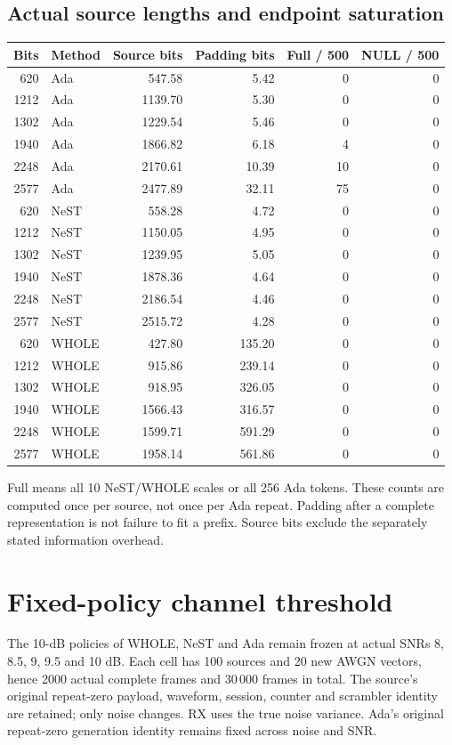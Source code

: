 \documentclass[10pt,letterpaper]{article}
\begin{document}
\subsection{Actual source lengths and endpoint saturation}
\begin{longtable}{@{}rlrrrr@{}}\toprule
Bits & Method & Source bits & Padding bits & Full / 500 & NULL / 500\\\midrule\endhead
620 & Ada & 547.58 & 5.42 & 0 & 0\\
1212 & Ada & 1139.70 & 5.30 & 0 & 0\\
1302 & Ada & 1229.54 & 5.46 & 0 & 0\\
1940 & Ada & 1866.82 & 6.18 & 4 & 0\\
2248 & Ada & 2170.61 & 10.39 & 10 & 0\\
2577 & Ada & 2477.89 & 32.11 & 75 & 0\\
620 & NeST & 558.28 & 4.72 & 0 & 0\\
1212 & NeST & 1150.05 & 4.95 & 0 & 0\\
1302 & NeST & 1239.95 & 5.05 & 0 & 0\\
1940 & NeST & 1878.36 & 4.64 & 0 & 0\\
2248 & NeST & 2186.54 & 4.46 & 0 & 0\\
2577 & NeST & 2515.72 & 4.28 & 0 & 0\\
620 & WHOLE & 427.80 & 135.20 & 0 & 0\\
1212 & WHOLE & 915.86 & 239.14 & 0 & 0\\
1302 & WHOLE & 918.95 & 326.05 & 0 & 0\\
1940 & WHOLE & 1566.43 & 316.57 & 0 & 0\\
2248 & WHOLE & 1599.71 & 591.29 & 0 & 0\\
2577 & WHOLE & 1958.14 & 561.86 & 0 & 0\\
\bottomrule\end{longtable}
Full means all 10 NeST/WHOLE scales or all 256 Ada tokens. These counts are computed once per source, not once per Ada repeat. Padding after a complete representation is not failure to fit a prefix. Source bits exclude the separately stated information overhead.


\section{Fixed-policy channel threshold}
The 10-dB policies of WHOLE, NeST and Ada remain frozen at actual SNRs 8, 8.5, 9, 9.5 and 10 dB. Each cell has 100 sources and 20 new AWGN vectors, hence 2000 actual complete frames and 30\,000 frames in total. The source's original repeat-zero payload, waveform, session, counter and scrambler identity are retained; only noise changes. RX uses the true noise variance. Ada's original repeat-zero generation identity remains fixed across noise and SNR.
\end{document}
